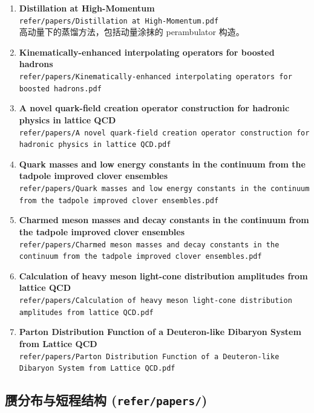 \documentclass[12pt,a4paper]{ctexart}
\begin{document}
\begin{enumerate}
    \item \textbf{Distillation at High-Momentum} \\
    \texttt{refer/papers/Distillation at High-Momentum.pdf} \\
    高动量下的蒸馏方法，包括动量涂抹的 perambulator 构造。

    \item \textbf{Kinematically-enhanced interpolating operators for boosted hadrons} \\
    \texttt{refer/papers/Kinematically-enhanced interpolating operators for boosted hadrons.pdf}

    \item \textbf{A novel quark-field creation operator construction for hadronic physics in lattice QCD} \\
    \texttt{refer/papers/A novel quark-field creation operator construction for hadronic physics in lattice QCD.pdf}

    \item \textbf{Quark masses and low energy constants in the continuum from the tadpole improved clover ensembles} \\
    \texttt{refer/papers/Quark masses and low energy constants in the continuum from the tadpole improved clover ensembles.pdf}

    \item \textbf{Charmed meson masses and decay constants in the continuum from the tadpole improved clover ensembles} \\
    \texttt{refer/papers/Charmed meson masses and decay constants in the continuum from the tadpole improved clover ensembles.pdf}

    \item \textbf{Calculation of heavy meson light-cone distribution amplitudes from lattice QCD} \\
    \texttt{refer/papers/Calculation of heavy meson light-cone distribution amplitudes from lattice QCD.pdf}

    \item \textbf{Parton Distribution Function of a Deuteron-like Dibaryon System from Lattice QCD} \\
    \texttt{refer/papers/Parton Distribution Function of a Deuteron-like Dibaryon System from Lattice QCD.pdf}
\end{enumerate}

\subsection{赝分布与短程结构 (\texttt{refer/papers/})}
\end{document}
